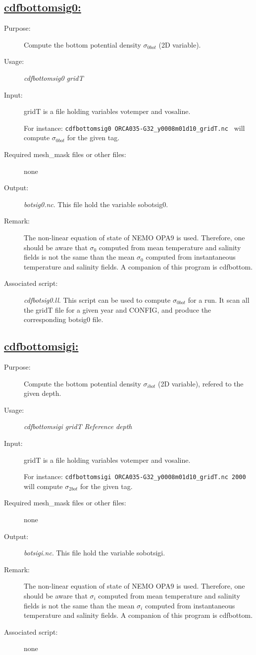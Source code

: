\documentclass[a4paper,11pt]{article}
\begin{document}
\newpage
\subsection*{\underline{cdfbottomsig0:}}
\begin{description}
\item[Purpose:] Compute the bottom potential density ${\sigma}_{0bot}$ (2D variable).
\item[Usage:] {\em cdfbottomsig0 gridT }
\item[Input:] gridT is a file holding variables votemper and vosaline.

For instance: {\tt cdfbottomsig0  ORCA035-G32\_y0008m01d10\_gridT.nc }
will compute ${\sigma}_{0bot}$ for the given tag.
\item[Required mesh\_mask files or other files:]  none
\item[Output:] {\em botsig0.nc}. This file hold the variable sobotsig0.
\item[Remark:]  The non-linear equation of state of NEMO OPA9 is used. Therefore, one should be aware that  ${\sigma}_0$
computed from mean temperature and salinity fields is not the same than the mean ${\sigma}_0$ computed from instantaneous
temperature and salinity fields. A companion of this program is cdfbottom.
\item[Associated script:] {\em cdfbotsig0.ll}. This script can be used to compute ${\sigma}_{0bot}$ for a run. It scan all
the gridT file for a given year and CONFIG, and produce the corresponding botsig0 file.
\end{description}

\newpage
\subsection*{\underline{cdfbottomsigi:}}
\begin{description}
\item[Purpose:] Compute the bottom potential density ${\sigma}_{ibot}$ (2D variable), refered to the given depth.
\item[Usage:] {\em cdfbottomsigi gridT Reference depth}
\item[Input:] gridT is a file holding variables votemper and vosaline.

For instance: {\tt cdfbottomsigi  ORCA035-G32\_y0008m01d10\_gridT.nc 2000 }
will compute ${\sigma}_{2bot}$ for the given tag.
\item[Required mesh\_mask files or other files:]  none
\item[Output:] {\em botsigi.nc}. This file hold the variable sobotsigi.
\item[Remark:]  The non-linear equation of state of NEMO OPA9 is used. Therefore, one should be aware that  ${\sigma}_i$
computed from mean temperature and salinity fields is not the same than the mean ${\sigma}_i$ computed from instantaneous
temperature and salinity fields. A companion of this program is cdfbottom.
\item[Associated script:] none
\end{description}
\end{document}
